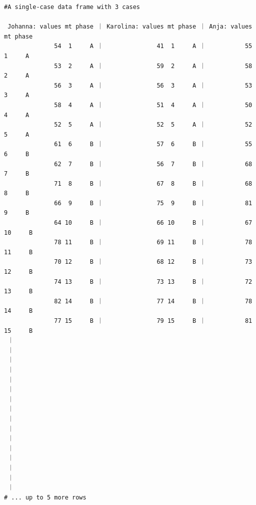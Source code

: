 \documentclass[
]{book}
\begin{document}
\begin{verbatim}
#A single-case data frame with 3 cases

 Johanna: values mt phase ｜ Karolina: values mt phase ｜ Anja: values mt phase
              54  1     A ｜               41  1     A ｜           55  1     A
              53  2     A ｜               59  2     A ｜           58  2     A
              56  3     A ｜               56  3     A ｜           53  3     A
              58  4     A ｜               51  4     A ｜           50  4     A
              52  5     A ｜               52  5     A ｜           52  5     A
              61  6     B ｜               57  6     B ｜           55  6     B
              62  7     B ｜               56  7     B ｜           68  7     B
              71  8     B ｜               67  8     B ｜           68  8     B
              66  9     B ｜               75  9     B ｜           81  9     B
              64 10     B ｜               66 10     B ｜           67 10     B
              78 11     B ｜               69 11     B ｜           78 11     B
              70 12     B ｜               68 12     B ｜           73 12     B
              74 13     B ｜               73 13     B ｜           72 13     B
              82 14     B ｜               77 14     B ｜           78 14     B
              77 15     B ｜               79 15     B ｜           81 15     B
 ｜
 ｜
 ｜
 ｜
 ｜
 ｜
 ｜
 ｜
 ｜
 ｜
 ｜
 ｜
 ｜
 ｜
 ｜
 ｜
# ... up to 5 more rows
\end{verbatim}
\end{document}
